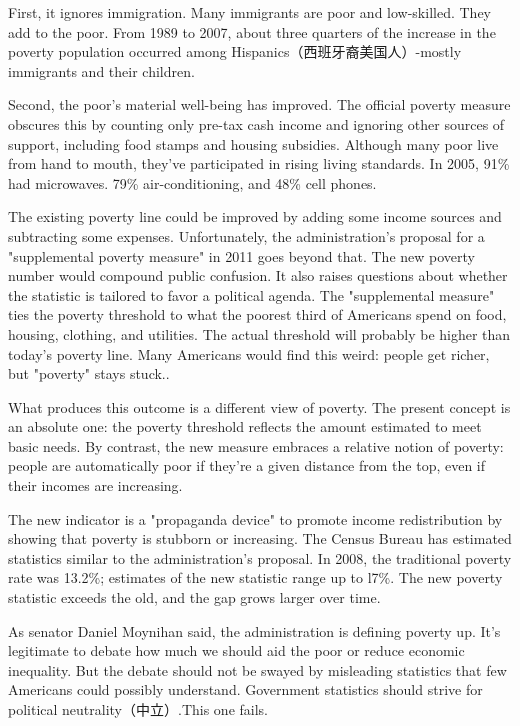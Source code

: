 \documentclass[UTF8,11pt]{ctexart}
\begin{document}
First, it ignores immigration. Many immigrants are poor and low-skilled. They add to the poor. From 1989 to 2007, about three quarters of the increase in the poverty population occurred among Hispanics（西班牙裔美国人）-mostly immigrants and their children.


Second, the poor's material well-being has improved. The official poverty measure obscures this by counting only pre-tax cash income and ignoring other sources of support, including food stamps and housing subsidies. Although many poor live from hand to mouth, they've participated in rising living standards. In 2005, 91\% had microwaves. 79\% air-conditioning, and 48\% cell phones.


The existing poverty line could be improved by adding some income sources and subtracting some expenses. Unfortunately, the administration's proposal for a "supplemental poverty measure" in 2011 goes beyond that. The new poverty number would compound public confusion. It also raises questions about whether the statistic is tailored to favor a political agenda. The "supplemental measure" ties the poverty threshold to what the poorest third of Americans spend on food, housing, clothing, and utilities. The actual threshold will probably be higher than today's poverty line. Many Americans would find this weird: people get richer, but "poverty" stays stuck..


What produces this outcome is a different view of poverty. The present concept is an absolute one: the poverty threshold reflects the amount estimated to meet basic needs. By contrast, the new measure embraces a relative notion of poverty: people are automatically poor if they're a given distance from the top, even if their incomes are increasing.


The new indicator is a "propaganda device" to promote income redistribution by showing that poverty is stubborn or increasing. The Census Bureau has estimated statistics similar to the administration's proposal. In 2008, the traditional poverty rate was 13.2\%; estimates of the new statistic range up to l7\%. The new poverty statistic exceeds the old, and the gap grows larger over time.


As senator Daniel Moynihan said, the administration is defining poverty up. It's legitimate to debate how much we should aid the poor or reduce economic inequality. But the debate should not be swayed by misleading statistics that few Americans could possibly understand. Government statistics should strive for political neutrality（中立）.This one fails.
\end{document}
